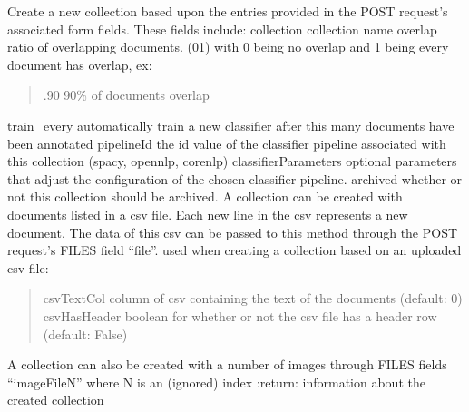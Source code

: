 \documentclass[letterpaper,10pt,english]{sphinxmanual}
\begin{document}

\begin{fulllineitems}
\label{\detokenize{autoapi/pine/backend/collections/bp/index:pine.backend.collections.bp._upload_documents}}
\end{fulllineitems}


\begin{fulllineitems}
\label{\detokenize{autoapi/pine/backend/collections/bp/index:pine.backend.collections.bp.create_collection}}
\sphinxAtStartPar
Create a new collection based upon the entries provided in the POST request’s associated form fields.
These fields include:
collection \sphinxhyphen{} collection name
overlap \sphinxhyphen{} ratio of overlapping documents. (0\sphinxhyphen{}1) with 0 being no overlap and 1 being every document has overlap, ex:
\begin{quote}

\sphinxAtStartPar
.90 \sphinxhyphen{} 90\% of documents overlap
\end{quote}

\sphinxAtStartPar
train\_every \sphinxhyphen{} automatically train a new classifier after this many documents have been annotated
pipelineId \sphinxhyphen{} the id value of the classifier pipeline associated with this collection (spacy, opennlp, corenlp)
classifierParameters \sphinxhyphen{} optional parameters that adjust the configuration of the chosen classifier pipeline.
archived \sphinxhyphen{} whether or not this collection should be archived.
A collection can be created with documents listed in a csv file. Each new line in the csv represents a new document.
The data of this csv can be passed to this method through the POST request’s FILES field “file”.
used when creating a collection based on an uploaded csv file:
\begin{quote}

\sphinxAtStartPar
csvTextCol \sphinxhyphen{} column of csv containing the text of the documents (default: 0)
csvHasHeader \sphinxhyphen{} boolean for whether or not the csv file has a header row (default: False)
\end{quote}

\sphinxAtStartPar
A collection can also be created with a number of images through FILES fields “imageFileN” where N is an (ignored) index
:return: information about the created collection

\end{fulllineitems}
\end{document}
